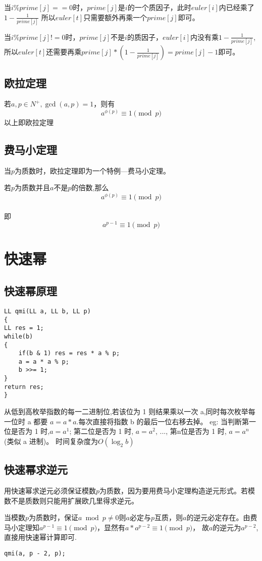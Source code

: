 \documentclass[]{book}
\begin{document}
当$i\%prime[j]==0$时，$prime[j]$是$i$的一个质因子，此时$euler[i]$内已经乘了$1-\frac{1}{prime[j]}$
所以$euler[t]$只需要额外再乘一个$prime[j]$即可。

当$i\%prime[j]!=0$时，$prime[j]$不是$i$的质因子，$euler[i]$内没有乘$1-\frac{1}{prime[j]}$,
所以$euler[t]$还需要再乘$prime[j]*(1-\frac{1}{prime[j]}) = prime[j] - 1$即可。

\section{欧拉定理}
若$a,p\in N ^+,\gcd(a, p) = 1$，则有
\[a^{\phi(p)}\equiv 1 \pmod{p}\]
以上即欧拉定理
\section{费马小定理}
当$p$为质数时，欧拉定理即为一个特例---费马小定理。

若$p$为质数并且$a$不是$p$的倍数,那么
\[a^{\phi(p)}\equiv 1 \pmod{p}\]\\即
\[a^{p-1}\equiv 1 \pmod{p}\]
\chapter{快速幂}
\section{快速幂原理}
\begin{lstlisting}
LL qmi(LL a, LL b, LL p)
{
LL res = 1;
while(b)
{
    if(b & 1) res = res * a % p;
    a = a * a % p;
    b >>= 1;
}
return res;
}
\end{lstlisting}
从低到高枚举指数的每一二进制位,若该位为 1 则结果乘以一次 a,同时每次枚举每一位时 a 都要 $a = a * a$.每次直接将指数 b 的最后一位右移去掉。
eg: 当判断第一位是否为 1 时,$a = a^{1}$; 第二位是否为 1 时, $a = a^{2}$, ..., 第n位是否为 1 时, $a = a^{n}$(类似 a 进制)。
时间复杂度为$O(\log_{2}{b})$

\section{快速幂求逆元}
用快速幂求逆元必须保证模数$p$为质数，因为要用费马小定理构造逆元形式。若模数不是质数则只能用扩展欧几里得求逆元。

当模数$p$为质数时，保证$a\bmod p \neq 0$则$a$必定与$p$互质，则$a$的逆元必定存在。由费马小定理知$a^{p-1} \equiv 1 \pmod{p}$，显然有$a*a^{p-2} \equiv 1 \pmod{p}$，
故$a$的逆元为$a^{p-2}$, 直接用快速幂计算即可.
\begin{lstlisting}
qmi(a, p - 2, p);
\end{lstlisting}
\end{document}
